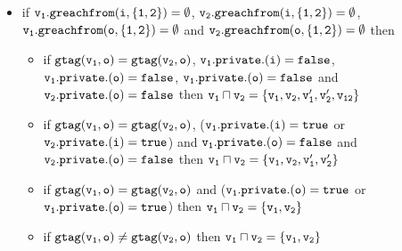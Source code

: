 \begin{itemize}
 
  \item if $\tt v_1.greachfrom(i,\{1,2\}) = \emptyset$, $\tt v_2.greachfrom(i,\{1,2\}) = \emptyset$, $\tt v_1.greachfrom(o,\{1,2\}) = \emptyset$ and $\tt v_2.greachfrom(o,\{1,2\}) = \emptyset$ then 
 \begin{itemize}
 
 
 \item if $\tt gtag(v_1, o) = gtag(v_2, o)$, $\tt v_1.private.(i) = false$, $\tt v_1.private.(o) = false$, $\tt v_1.private.(o) = false$ and $\tt v_2.private.(o) = false$ then  $\tt v_1 \sqcap v_2 = \{v_1,v_2,v_1',v_2',v_{12}\}$ %
    \item if $\tt gtag(v_1, o) = gtag(v_2, o)$, ($\tt v_1.private.(i) = true$ or $\tt v_2.private.(i) = true$) and $\tt v_1.private.(o) = false$ and $\tt v_2.private.(o) = false$ then  $\tt v_1 \sqcap v_2 = \{v_1,v_2,v_1',v_2'\}$  

  \item if $\tt gtag(v_1, o) = gtag(v_2, o)$ and ($\tt v_1.private.(o) = true$ or $\tt v_1.private.(o) = true$) then  $\tt v_1 \sqcap v_2 = \{v_1,v_2\}$ 

    \item if $\tt gtag(v_1, o) \neq gtag(v_2, o)$ then $\tt v_1 \sqcap v_2 = \{v_1,v_2\}$
 \end{itemize}
 
 \end{itemize}



%
